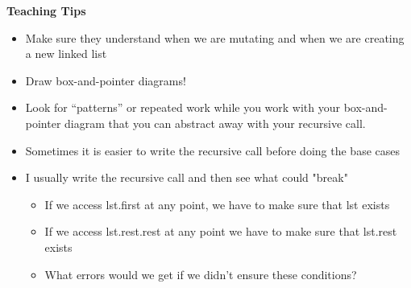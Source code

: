 \begin{blocksection}
\begin{guide}
    \textbf{Teaching Tips}
    \begin{itemize}
       \item Make sure they understand when we are mutating and when we are creating a new linked list
       \item Draw box-and-pointer diagrams!
       \item Look for “patterns” or repeated work while you work with your box-and-pointer diagram that you can abstract away with your recursive call.
       \item Sometimes it is easier to write the recursive call before doing the base cases
       \item I usually write the recursive call and then see what could "break"
       \begin{itemize}
           \item If we access lst.first at any point, we have to make sure that lst exists
           \item If we access lst.rest.rest at any point we have to make sure that lst.rest exists
           \item What errors would we get if we didn't ensure these conditions?
       \end{itemize}
    \end{itemize}
 \end{guide}
\end{blocksection}
